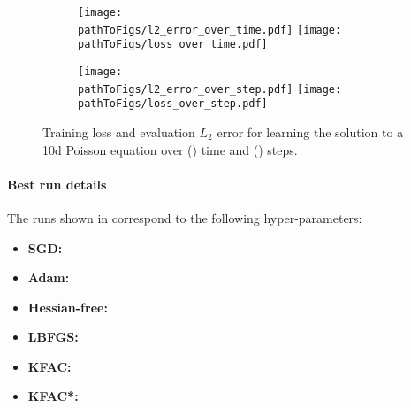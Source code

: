 \begin{figure}[!h]
  \centering
  \def\pathToFigs{kfac_pinns_exp/exp21_poisson_10d}
  \begin{subfigure}[t]{1.0\linewidth}
    \caption{}\label{subfig:poisson_10d-time}
    \texttt{[image: \\pathToFigs/l2\_error\_over\_time.pdf]}
    \texttt{[image: \\pathToFigs/loss\_over\_time.pdf]}
  \end{subfigure}
  \begin{subfigure}[t]{1.0\linewidth}
    \caption{}\label{subfig:poisson_10d-step}
    \texttt{[image: \\pathToFigs/l2\_error\_over\_step.pdf]}
    \texttt{[image: \\pathToFigs/loss\_over\_step.pdf]}
  \end{subfigure}
  \caption{Training loss and evaluation $L_2$ error for learning the solution to a 10d Poisson equation over () time and () steps.}\label{fig:poisson_10d-appendix}
\end{figure}

\paragraph{Best run details}
The runs shown in  correspond to the following hyper-parameters:
\begin{itemize}
  \def\pathToRuns{kfac_pinns_exp/exp21_poisson_10d/tex/}
\item \textbf{SGD:} 
\item \textbf{Adam:} 
\item \textbf{Hessian-free:} 
\item \textbf{LBFGS:} 
\item \textbf{KFAC:} 
\item \textbf{KFAC*:} 
\end{itemize}

